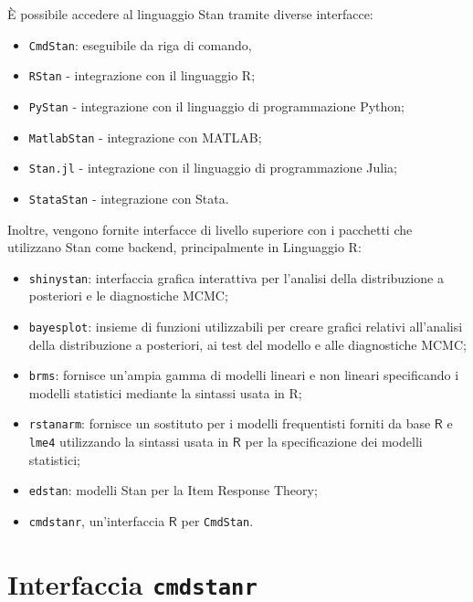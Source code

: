 \documentclass[
  11pt,
]{krantz}
\providecommand{\tightlist}{%
  \setlength{\itemsep}{0pt}\setlength{\parskip}{0pt}}
\newcommand{\R}{\textsf{R}} %
\theoremstyle{definition}
\theoremstyle{definition}
\theoremstyle{definition}
\theoremstyle{definition}
\theoremstyle{remark}
\begin{document}
È possibile accedere al linguaggio Stan tramite diverse interfacce:

\begin{itemize}
\tightlist
\item
  \texttt{CmdStan}: eseguibile da riga di comando,
\item
  \texttt{RStan} - integrazione con il linguaggio \R;
\item
  \texttt{PyStan} - integrazione con il linguaggio di programmazione Python;
\item
  \texttt{MatlabStan} - integrazione con MATLAB;
\item
  \texttt{Stan.jl} - integrazione con il linguaggio di programmazione Julia;
\item
  \texttt{StataStan} - integrazione con Stata.
\end{itemize}

Inoltre, vengono fornite interfacce di livello superiore con i pacchetti che utilizzano Stan come backend, principalmente in Linguaggio \R:

\begin{itemize}
\tightlist
\item
  \texttt{shinystan}: interfaccia grafica interattiva per l'analisi della distribuzione a posteriori e le diagnostiche MCMC;\\
\item
  \texttt{bayesplot}: insieme di funzioni utilizzabili per creare grafici relativi all'analisi della distribuzione a posteriori, ai test del modello e alle diagnostiche MCMC;\\
\item
  \texttt{brms}: fornisce un'ampia gamma di modelli lineari e non lineari specificando i modelli statistici mediante la sintassi usata in \R;
\item
  \texttt{rstanarm}: fornisce un sostituto per i modelli frequentisti forniti da base \(\R\) e \texttt{lme4} utilizzando la sintassi usata in \(\R\) per la specificazione dei modelli statistici;
\item
  \texttt{edstan}: modelli Stan per la Item Response Theory;
\item
  \texttt{cmdstanr}, un'interfaccia \(\R\) per \texttt{CmdStan}.
\end{itemize}

\hypertarget{interfaccia-cmdstanr}{%
\section{\texorpdfstring{Interfaccia \texttt{cmdstanr}}{Interfaccia cmdstanr}}\label{interfaccia-cmdstanr}}
\end{document}
